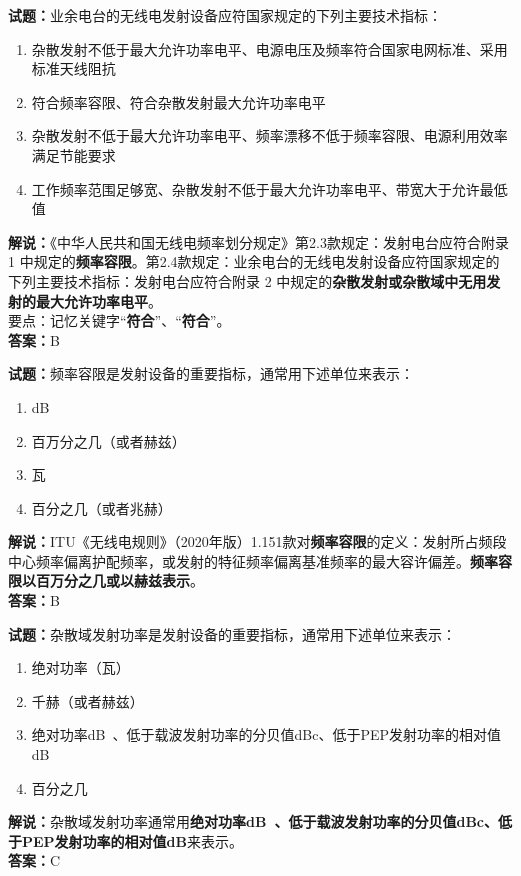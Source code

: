 \documentclass{ctexbook}
\begin{document}
\bigskip


\noindent\textbf{试题：}业余电台的无线电发射设备应符国家规定的下列主要技术指标：
\begin{enumerate}[leftmargin=3em]
\item 杂散发射不低于最大允许功率电平、电源电压及频率符合国家电网标准、采用标准天线阻抗
\item 符合频率容限、符合杂散发射最大允许功率电平
\item 杂散发射不低于最大允许功率电平、频率漂移不低于频率容限、电源利用效率满足节能要求
\item 工作频率范围足够宽、杂散发射不低于最大允许功率电平、带宽大于允许最低值
\end{enumerate}
\noindent\textbf{解说：}《中华人民共和国无线电频率划分规定》第2.3款规定：发射电台应符合附录 1 中规定的\textbf{频率容限}。第2.4款规定：业余电台的无线电发射设备应符国家规定的下列主要技术指标：发射电台应符合附录 2 中规定的\textbf{杂散发射或杂散域中无用发射的最大允许功率电平}。\\要点：记忆关键字“\textbf{符合}”、“\textbf{符合}”。\\\noindent\textbf{答案：}B




\bigskip


\noindent\textbf{试题：}频率容限是发射设备的重要指标，通常用下述单位来表示：
\begin{enumerate}[leftmargin=3em]
\item dB
\item 百万分之几（或者赫兹）
\item 瓦
\item 百分之几（或者兆赫）
\end{enumerate}
\noindent\textbf{解说：}ITU《无线电规则》（2020年版）1.151款对\textbf{频率容限}的定义：发射所占频段中心频率偏离护配频率，或发射的特征频率偏离基准频率的最大容许偏差。\textbf{频率容限以百万分之几或以赫兹表示}。\\\noindent\textbf{答案：}B




\bigskip


\noindent\textbf{试题：}杂散域发射功率是发射设备的重要指标，通常用下述单位来表示：
\begin{enumerate}[leftmargin=3em]
\item 绝对功率（瓦）
\item 千赫（或者赫兹）%
\item 绝对功率\unit[qualifier-mode=combine]{\deci\bel{}}、低于载波发射功率的分贝值dBc、低于PEP发射功率的相对值dB
\item 百分之几
\end{enumerate}
\noindent\textbf{解说：}杂散域发射功率通常用\textbf{绝对功率\unit[qualifier-mode=combine]{\deci\bel{}}、低于载波发射功率的分贝值dBc、低于PEP发射功率的相对值dB}来表示。\\\noindent\textbf{答案：}C
\end{document}
